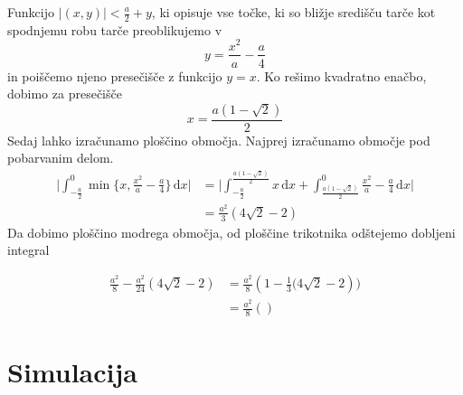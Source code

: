 \documentclass{amsart}
\theoremstyle{definition} %
\theoremstyle{plain} %
\begin{document}
Funkcijo $|(x,y)| < \frac{a}{2} + y$, ki opisuje vse točke, ki so bližje središču tarče kot
spodnjemu robu tarče preoblikujemo v 
\begin{equation*}
    y = \frac{x^2}{a} - \frac{a}{4}
\end{equation*}
in poiščemo njeno presečišče z funkcijo $y = x$. Ko rešimo kvadratno enačbo,
dobimo za presečišče
\begin{equation*}
    x=\frac{a(1-\sqrt{2})}{2}
\end{equation*}
Sedaj lahko izračunamo ploščino območja. Najprej izračunamo območje pod pobarvanim delom.
\begin{align*}
    \Bigg| \int_{-\frac{a}{2}}^{0} \min \{ x, \tfrac{x^2}{a} - \tfrac{a}{4} \} \, \mathrm{d}x \Bigg|
    &= \Bigg| \int_{-\frac{a}{2}}^{\frac{a(1-\sqrt{2})}{2}} x \, \mathrm{d}x + \int_{\frac{a(1-\sqrt{2})}{2}}^{0} \tfrac{x^2}{a} - \tfrac{a}{4} \, \mathrm{d}x \Bigg|\\
    &= \frac{a^2}{3}(4\sqrt{2}-2)
\end{align*}
Da dobimo ploščino modrega območja, od ploščine trikotnika odštejemo dobljeni integral

\begin{align*}
    \frac{a^2}{8} - \frac{a^2}{24}(4\sqrt{2}-2)
    &= \frac{a^2}{8} (1 - \frac{1}{3}\big(4\sqrt{2}-2)\big) \\
    &= \frac{a^2}{8} ()
\end{align*}

\section{Simulacija}
\end{document}
